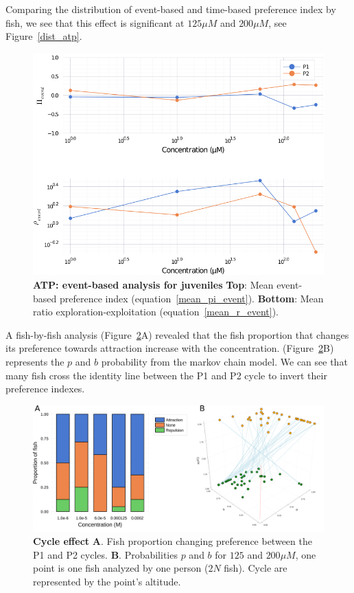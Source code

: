   Comparing the distribution of event-based and time-based preference index by fish, we see that this effect is significant at $125 \mu M$ and  $200 \mu M$, see Figure~\ref{dist_atp}.

    \begin{figure}[h!]
      \centering
      \includegraphics[width=1\textwidth]{part_2/assets/atp_event.png}
      \caption{\textbf{ATP: event-based analysis for juveniles} \textbf{Top}: Mean event-based preference index (equation~\ref{mean_pi_event}). \textbf{Bottom}: Mean ratio exploration-exploitation (equation~\ref{mean_r_event}).}
      \label{atp_event}
    \end{figure}

  A fish-by-fish analysis (Figure~\ref{proportion}A) revealed that the fish proportion that changes its preference towards attraction increase with the concentration. (Figure~\ref{proportion}B) represents the $p$ and $b$ probability from the markov chain model. We can see that many fish cross the identity line between the P1 and P2 cycle to invert their preference indexes.

    \begin{figure}[h!]
      \centering
      \includegraphics[width=1\textwidth]{part_2/assets/proportion.png}
      \caption{\textbf{Cycle effect} \textbf{A}. Fish proportion changing preference between the P1 and P2 cycles. \textbf{B}. Probabilities $p$ and $b$ for $125$ and $200 \mu M$, one point is one fish analyzed by one person ($2N$ fish). Cycle are represented by the point's altitude.}
      \label{proportion}
    \end{figure}

